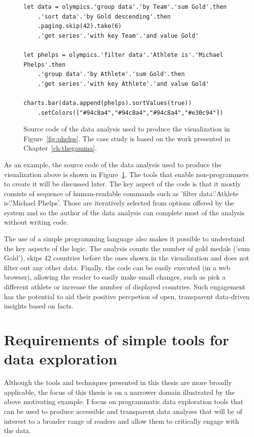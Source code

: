\documentclass[fleqn,11pt]{report}
\newcommand{\ident}[1]{\textnormal{\ttfamily #1}}
\theoremstyle{definition}
\begin{document}
\begin{figure}[t]
\begin{lstlisting}[language=thegamma]
let data = olympics.'group data'.'by Team'.'sum Gold'.then
    .'sort data'.'by Gold descending'.then
    .paging.skip(42).take(6)
    .'get series'.'with key Team'.'and value Gold'

let phelps = olympics.'filter data'.'Athlete is'.'Michael Phelps'.then
    .'group data'.'by Athlete'.'sum Gold'.then
    .'get series'.'with key Athlete'.'and value Gold'

charts.bar(data.append(phelps).sortValues(true))
    .setColors(["#94c8a4","#94c8a4","#94c8a4","#e30c94"])
\end{lstlisting}
\caption{Source code of the data analysis used to produce the visualization in
Figure~\ref{fig:phelps}. The case study is based on the work presented in Chapter~\ref{ch:thegamma}.}
\label{fig:gamma}
\end{figure}

As an example, the source code of the data analysis used to produce the visualization above is shown
in Figure~\ref{fig:gamma}. The tools that enable non-programmers to create it will be discussed
later. The key aspect of the code is that it mostly consists of sequence of human-readable
commands such as \ident{'filter data'.'Athlete is'.'Michael Phelps'}. Those are iteratively
selected from options offered by the system and so the author of the data analysis can complete
most of the analysis without writing code.

The use of a simple programming language also makes it possible to understand the key
aspects of the logic. The analysis counts the number of gold medals (\ident{'sum Gold'}),
skips 42 countries before the ones shown in the visualization and does not filter out any
other data. Finally, the code can be easily executed (in a web browser), allowing the reader
to easily make small changes, such as pick a different athlete or increase the number of displayed
countries. Such engagement has the potential to aid their positive percpetion of open, transparent
data-driven insights based on facts.

\section{Requirements of simple tools for data exploration}

Although the tools and techniques presented in this thesis are more broadly applicable,
the focus of this thesis is on a narrower domain illustrated by the above motivating example.
I focus on programmatic data exploration tools that can be used to produce accessible and
transparent data analyses that will be of interest to a broader range of readers and allow
them to critically engage with the data.
\end{document}
